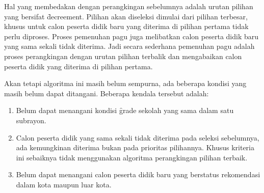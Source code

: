 Hal yang membedakan dengan perangkingan sebelumnya adalah urutan pilihan yang
bersifat \f{decreement}. Pilihan akan diseleksi dimulai dari pilihan terbesar,
khusus untuk calon peserta didik baru yang diterima di pilihan pertama tidak
perlu diproses. Proses pemenuhan pagu juga melibatkan calon peserta didik baru
yang sama sekali tidak diterima. Jadi secara sederhana pemenuhan pagu adalah
proses perangkingan dengan  urutan pilihan terbalik dan mengabaikan calon
peserta didik yang diterima di pilihan pertama.

Akan tetapi algoritma ini masih belum sempurna, ada beberapa kondisi yang masih
belum dapat ditangani. Beberapa kendala tersebut adalah:

\begin{enumerate} 
  \item Belum dapat menangani kondisi \f{grade} sekolah yang sama dalam satu
    subrayon.
  \item Calon peserta didik yang sama sekali tidak diterima pada seleksi
    sebelumnya, ada kemungkinan diterima bukan pada prioritas pilihannya.
    Khusus kriteria ini sebaiknya tidak menggunakan algoritma perangkingan
    pilihan terbaik.
  \item Belum dapat menangani calon peserta didik baru yang berstatus
    rekomendasi dalam kota maupun luar kota.
\end{enumerate}

